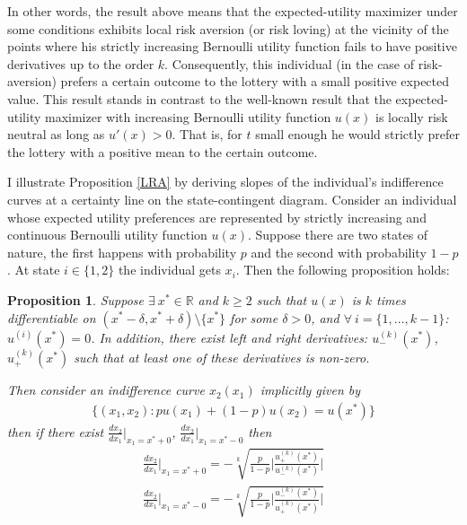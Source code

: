 \documentclass[a4paper]{article}
\newtheorem{proposition}[theorem]{Proposition}
\begin{document}
In other words, the result above means that the expected-utility maximizer under some conditions exhibits local risk aversion (or risk loving) at the vicinity of the points where his strictly increasing Bernoulli utility function fails to have positive derivatives up to the order $k$. Consequently, this individual (in the case of risk-aversion) prefers a certain outcome to the lottery with a small positive expected value. This result stands in contrast to the well-known result that the expected-utility maximizer with increasing Bernoulli utility function $u(x)$ is locally risk neutral as long as $u'(x) > 0$. That is, for $t$ small enough he would strictly prefer the lottery with a positive mean to the certain outcome.





I illustrate Proposition \ref{LRA} by deriving slopes of the individual's indifference curves at a certainty line on the state-contingent diagram. 
Consider an individual whose expected utility preferences are represented by strictly increasing and continuous Bernoulli utility function $u(x)$. Suppose there are two states of nature, the first happens with probability $p$ and the second with probability $1-p$. At state $i \in \{1, 2\}$ the individual gets $x_i$. Then the following proposition holds:
\begin{proposition}\label{slope}
	Suppose $\exists\ x^* \in \mathbb{R}$ and $k \ge 2$ such that $u(x)$ is $k$ times differentiable on $(x^*-\delta, x^*+\delta)\setminus \{x^*\}$ for some $\delta>0$, and $\forall\ i = \{1, \dots, k-1  \}$: $u^{(i)}(x^*) = 0$. In addition, there exist left and right derivatives: $u_{-}^{(k)}(x^*)$, $u_{+}^{(k)}(x^*)$ such that  at least one of these derivatives is non-zero.
	
	
	Then consider an indifference curve $x_2(x_1)$ implicitly given by 
	\begin{align}\label{ind}
		\{ (x_1, x_2): pu(x_1)+(1-p)u(x_2) = u(x^*) \}
	\end{align}
then if there exist $\frac{d x_2}{d x_1} \bigg|_{x_1=x^*+0}$,  $\frac{d x_2}{d x_1} \bigg|_{x_1=x^*-0}$ then
	\begin{align}
		\frac{d x_2}{d x_1} \bigg|_{x_1=x^*+0} = -\sqrt[k]{\frac{p}{1-p} \bigg|  \frac{u^{(k)}_{+}(x^*)}{u^{(k)}_{-}(x^*)} \bigg|  }\\
		\frac{d x_2}{d x_1} \bigg|_{x_1=x^*-0} = -\sqrt[k]{\frac{p}{1-p} \bigg|  \frac{u^{(k)}_{-}(x^*)}{u^{(k)}_{+}(x^*)} \bigg|  }
	\end{align}
\end{proposition}
\end{document}
